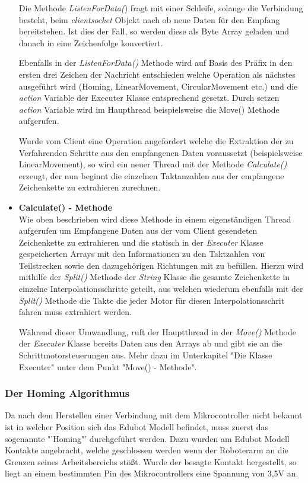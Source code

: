 \begin{itemize}
Die Methode \textit{ListenForData(}) fragt mit einer Schleife, solange die Verbindung besteht, beim  \textit{clientsocket} Objekt nach ob neue Daten für den Empfang bereitstehen. Ist dies der Fall, so werden diese als Byte Array geladen und danach in eine Zeichenfolge konvertiert.

Ebenfalls in der \textit{ListenForData()} Methode wird auf Basis des Präfix in den ersten drei Zeichen der Nachricht entschieden welche Operation als nächstes ausgeführt wird (Homing, LinearMovement, CircularMovement etc.) und die \textit{action} Variable der Executer Klasse entsprechend gesetzt. Durch setzen \textit{action} Variable wird im Haupthread beispielsweise die Move() Methode aufgerufen.

Wurde vom Client eine Operation angefordert welche die Extraktion der zu Verfahrenden Schritte aus den empfangenen Daten voraussetzt (beispielsweise LinearMovement), so wird ein neuer Thread mit der Methode \textit{Calculate()} erzeugt, der nun beginnt die einzelnen Taktanzahlen aus der empfangene Zeichenkette zu extrahieren zurechnen.

\item \textbf{Calculate() - Methode}\\
Wie oben beschrieben wird diese Methode in einem eigenständigen Thread aufgerufen um Empfangene Daten aus der vom Client gesendeten Zeichenkette zu extrahieren und die statisch in der \textit{Executer} Klasse gespeicherten Arrays mit den Informationen zu den Taktzahlen von Teilstrecken sowie den dazugehörigen Richtungen mit zu befüllen. 
Hierzu wird mithilfe der \textit{Split()} Methode der \textit{String} Klasse die gesamte Zeichenkette in einzelne Interpolationsschritte geteilt, aus welchen wiederum ebenfalls mit der \textit{Split()} Methode die Takte die jeder Motor für diesen Interpolationsschrit fahren muss extrahiert werden.

Während dieser Umwandlung, ruft der Hauptthread in der \textit{Move()} Methode der \textit{Executer} Klasse bereits Daten aus den Arrays ab und gibt sie an die Schrittmotorsteuerungen aus. Mehr dazu im Unterkapitel "Die Klasse Executer" unter dem Punkt "Move() - Methode".

\end{itemize}
\subsubsection{Der Homing Algorithmus}
Da nach dem Herstellen einer Verbindung mit dem Mikrocontroller nicht bekannt ist in welcher Position sich das Edubot Modell befindet, muss zuerst das sogenannte "'Homing"' durchgeführt werden. Dazu wurden am Edubot Modell Kontakte angebracht, welche geschlossen werden wenn der Roboterarm an die Grenzen seines Arbeitsbereichs stößt. Wurde der besagte Kontakt hergestellt, so liegt an einem bestimmten Pin des Mikrocontrollers eine Spannung von 3,5V an. 

